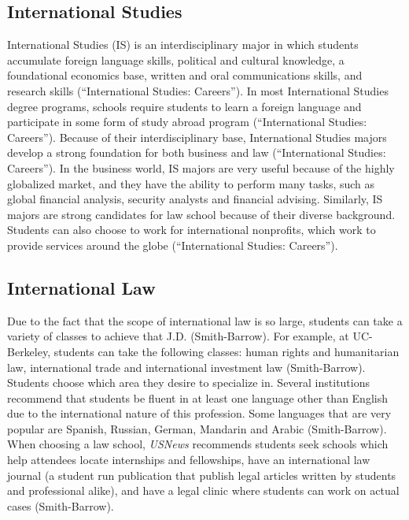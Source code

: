 \begin{multicols}{2}
    \subsection{International Studies}
        International Studies (IS) is an interdisciplinary major in which students accumulate foreign language skills, political and cultural knowledge, a foundational economics base, written and oral communications skills, and research skills (“International Studies: Careers”). In most International Studies degree programs, schools require students to learn a foreign language and participate in some form of study abroad program (“International Studies: Careers”). Because of their interdisciplinary base, International Studies majors develop a strong foundation for both business and law (“International Studies: Careers”). In the business world, IS majors are very useful because of the highly globalized market, and they have the ability to perform many tasks, such as global financial analysis, security analysts and financial advising. Similarly, IS majors are strong candidates for law school because of their diverse background. Students can also choose to work for international nonprofits, which work to provide services around the globe (“International Studies: Careers”). 
    \subsection{International Law}
        Due to the fact that the scope of international law is so large, students can take a variety of classes to achieve that J.D. (Smith-Barrow). For example, at UC-Berkeley, students can take the following classes: human rights and humanitarian law, international trade and international investment law (Smith-Barrow). Students choose which area they desire to specialize in. Several institutions recommend that students be fluent in at least one language other than English due to the international nature of this profession. Some languages that are very popular are Spanish, Russian, German, Mandarin and Arabic (Smith-Barrow). When choosing a law school, \textit{USNews} recommends students seek schools which help attendees locate internships and fellowships, have an international law journal (a student run publication that publish legal articles written by students and professional alike), and have a legal clinic where students can work on actual cases (Smith-Barrow). 


\end{multicols}

